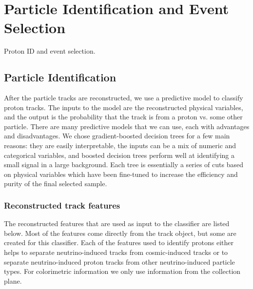 \section{Particle Identification and Event Selection}\label{protonid}
\hspace{\parindent}
Proton ID and event selection.

\subsection{Particle Identification}
  After the particle tracks are reconstructed, we use a predictive model to
  classify proton tracks. The inputs to the model are the reconstructed
  physical variables, and the output is the probability that the track is from
  a proton vs. some other particle. There are many predictive models that we
  can use, each with advantages and disadvantages. We chose gradient-boosted
  decision trees for a few main reasons: they are easily interpretable, the
  inputs can be a mix of numeric and categorical variables, and boosted
  decision trees perform well at identifying a small signal in a large
  background.  Each tree is essentially a series of cuts based on physical
  variables which have been fine-tuned to increase the efficiency and purity of
  the final selected sample.
  \subsubsection{Reconstructed track features}
    The reconstructed features that are used as input to the classifier are
    listed below. Most of the features come directly from the track object, but
    some are created for this classifier. Each of the features used to identify
    protons either helps to separate neutrino-induced tracks from
    cosmic-induced tracks or to separate neutrino-induced proton tracks from
    other neutrino-induced particle types. For colorimetric information we only
    use information from the collection plane.

